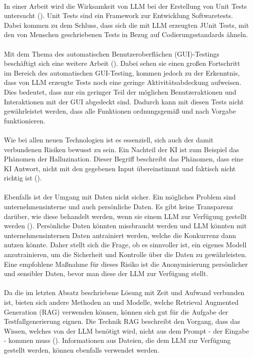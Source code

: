 \documentclass[12pt,toc=bib,toc=listof]{scrreprt}
\begin{document}
\\
In einer Arbeit wird die Wirksamkeit von LLM bei der Erstellung von Unit Tests untersucht (\cite{Ouédraogo2024}). Unit Tests sind ein Framework zur Entwicklung Softwaretests. Dabei kommen \textcite{Ouédraogo2024} zu dem Schluss, dass sich die mit LLM erzeugten JUnit Tests, mit den von Menschen geschriebenen Tests in Bezug auf Codierungsstandards ähneln.\\
\\
Mit dem Thema des automatischen Benutzeroberflächen (GUI)-Testings beschäftigt sich eine weitere Arbeit (\cite{Liu2024}). Dabei sehen sie einen großen Fortschritt im Bereich des automatischen GUI-Testing, kommen jedoch zu der Erkenntnis, dass von LLM erzeugte Tests noch eine geringe Aktivitätsabdeckung aufweisen. Dies bedeutet, dass nur ein geringer Teil der möglichen Benutzeraktionen und Interaktionen mit der GUI abgedeckt sind. Dadurch kann mit diesen Tests nicht gewährleistet werden, dass alle Funktionen ordnungsgemäß und nach Vorgabe funktionieren.\\
\\
Wie bei allen neuen Technologien ist es essenziell, sich auch der damit verbundenen Risiken bewusst zu sein. Ein Nachteil der KI ist zum Beispiel das Phänomen der Halluzination. Dieser Begriff beschreibt das Phänomen, dass eine KI Antwort, nicht mit den gegebenen Input übereinstimmt und faktisch nicht richtig ist (\cite{Siebert2024}).\\
\\
Ebenfalls ist der Umgang mit Daten nicht sicher. Ein mögliches Problem sind unternehmensinterne und auch persönliche Daten. Es gibt keine Transparenz darüber, wie diese behandelt werden, wenn sie einem LLM zur Verfügung gestellt werden (\cite{Möllers2024}). Persönliche Daten könnten missbraucht werden und LLM könnten mit unternehmensinternen Daten antrainiert werden, welche die Konkurrenz dann nutzen könnte. Daher stellt sich die Frage, ob es sinnvoller ist, ein eigenes Modell anzutrainieren, um die Sicherheit und Kontrolle über die Daten zu gewährleisten. Eine empfohlene Maßnahme für dieses Risiko ist die Anonymisierung persönlicher und sensibler Daten, bevor man diese der LLM zur Verfügung stellt.\\
\\
Da die im letzten Absatz beschriebene Lösung mit Zeit und Aufwand verbunden ist, bieten sich andere Methoden an und Modelle, welche Retrieval Augmented Generation (RAG) verwenden können, können sich gut für die Aufgabe der Testfallgenerierung eignen. Die Technik RAG beschreibt den Vorgang, dass das Wissen, welches von der LLM benötigt wird, nicht aus dem Prompt - der Eingabe - kommen muss (\cite{Honroth2024}). Informationen aus Dateien, die dem LLM zur Verfügung gestellt werden, können ebenfalls verwendet werden.
\end{document}
